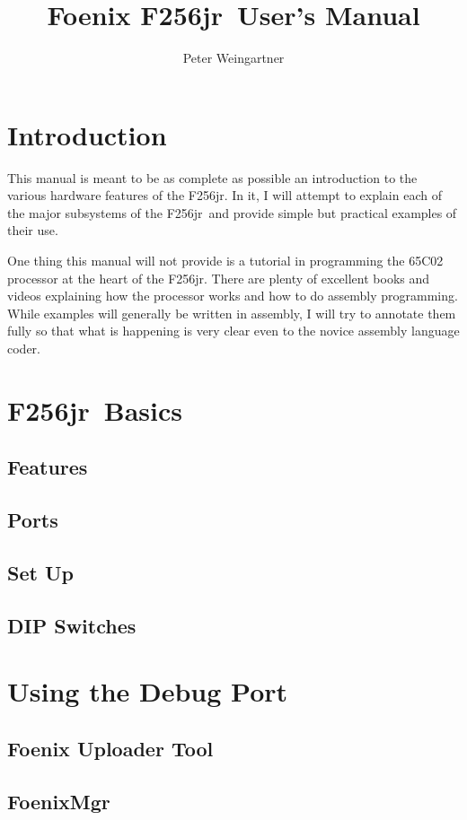 \documentclass[oneside]{book}
\newcommand{\jr}{F256jr}
\begin{document}
\title{Foenix \jr\ User's Manual}
\author{Peter Weingartner}
\maketitle

\tableofcontents
\listoftables

\chapter{Introduction}

This manual is meant to be as complete as possible an introduction to the various hardware features of the \jr. In it, I will attempt to explain each of the major subsystems of the \jr\ and provide simple but practical examples of their use.

One thing this manual will not provide is a tutorial in programming the 65C02 processor at the heart of the \jr. There are plenty of excellent books and videos explaining how the processor works and how to do assembly programming. While examples will generally be written in assembly, I will try to annotate them fully so that what is happening is very clear even to the novice assembly language coder.

\chapter{\jr\ Basics}

\section{Features}

\section{Ports}

\section{Set Up}

\section{DIP Switches}












\chapter{Using the Debug Port}

\section{Foenix Uploader Tool}

\section{FoenixMgr}
\end{document}
